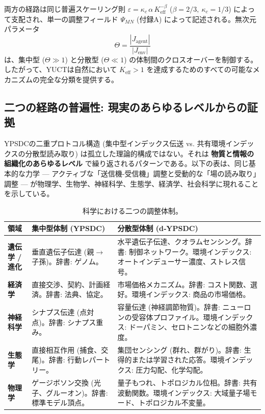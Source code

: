 \documentclass[11pt,a4paper]{article}
\begin{document}
	\medskip
	\noindent
	両方の経路は同じ普遍スケーリング則 $\varepsilon = \kappa_c \, \alpha \, K_{\mathrm{eff}}^{-\beta}$ ($\beta = 2/3,\ \kappa_c = 1/3$) によって支配され、単一の調整フィールド $\Psi_{MN}$ (付録A) によって記述される。無次元パラメータ
	\[
	\Theta = \frac{|J_{\mathrm{agent}}|}{|J_{\mathrm{env}}|}
	\]
	は、集中型 ($\Theta \gg 1$) と分散型 ($\Theta \ll 1$) の体制間のクロスオーバーを制御する。したがって、YUCTは自然において $K_{\mathrm{eff}} > 1$ を達成するためのすべての可能なメカニズムの完全な分類を提供する。
	
	\subsection{二つの経路の普遍性: 現実のあらゆるレベルからの証拠}
	\label{subsec:universality-two-paths}
	
	YPSDCの二重プロトコル構造 (集中型インデックス伝送 vs. 共有環境インデックスの分散型読み取り) は孤立した理論的構成ではない。それは \textbf{物質と情報の組織化のあらゆるレベル} で繰り返されるパターンである。以下の表は、同じ基本的な力学 — アクティブな「送信機-受信機」調整と受動的な「場の読み取り」調整 — が物理学、生物学、神経科学、生態学、経済学、社会科学に現れることを示している。
	
	\begin{table}[htbp]
		\centering
		\caption{科学における二つの調整体制。}
		\label{tab:two-regimes-sciences}
	
			\begin{tabular}{p{3.0cm}p{5.5cm}p{6.5cm}}
				\toprule
				\textbf{領域} & \textbf{集中型体制 (YPSDC)} & \textbf{分散型体制 (d‑YPSDC)} \\
				\midrule
				\textbf{遺伝学 / 進化} &
				垂直遺伝子伝達 (親$\to$子孫)。辞書: ゲノム。 &
				水平遺伝子伝達、クオラムセンシング。辞書: 制御ネットワーク。環境インデックス: オートインデューサー濃度、ストレス信号。 \\
				\midrule
				\textbf{経済学} &
				直接交渉、契約、計画経済。辞書: 法典、協定。 &
				市場価格メカニズム。辞書: コスト関数、選好。環境インデックス: 商品の市場価格。 \\
				\midrule
				\textbf{神経科学} &
				シナプス伝達 (点対点)。辞書: シナプス重み。 &
				容量伝達 (神経調節物質)。辞書: ニューロンの受容体プロファイル。環境インデックス: ドーパミン、セロトニンなどの細胞外濃度。 \\
				\midrule
				\textbf{生態学} &
				直接相互作用 (捕食、交尾)。辞書: 行動レパートリー。 &
				集団センシング (群れ、群がり)。辞書: 生得的または学習された応答。環境インデックス: 圧力勾配、化学勾配。 \\
				\midrule
				\textbf{物理学} &
				ゲージボソン交換 (光子、グルーオン)。辞書: 標準モデル頂点。 &
				量子もつれ、トポロジカル位相。辞書: 共有波動関数。環境インデックス: 大域量子場モード、トポロジカル不変量。 \\
				\bottomrule
			\end{tabular}
		
	\end{table}
	
\end{document}

